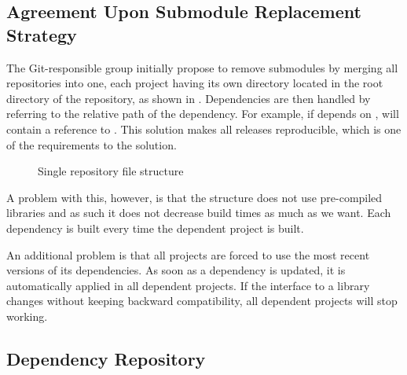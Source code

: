 \subsection{Agreement Upon Submodule Replacement Strategy}
The Git-responsible group initially propose to remove submodules by merging all repositories into one, each project having its own directory located in the root directory of the repository, as shown in . Dependencies are then handled by referring to the relative path of the dependency. For example, if  depends on ,  will contain a reference to . This solution makes all releases reproducible, which is one of the requirements to the solution.
\begin{figure}
\caption{Single repository file structure} \label{fig:single_repo_structure}
\end{figure}
A problem with this, however, is that the structure does not use pre-compiled libraries and as such it does not decrease build times as much as we want. Each dependency is built every time the dependent project is built.

An additional problem is that all projects are forced to use the most recent versions of its dependencies. As soon as a dependency is updated, it is automatically applied in all dependent projects. If the interface to a library changes without keeping backward compatibility, all dependent projects will stop working.


\subsection{Dependency Repository}
